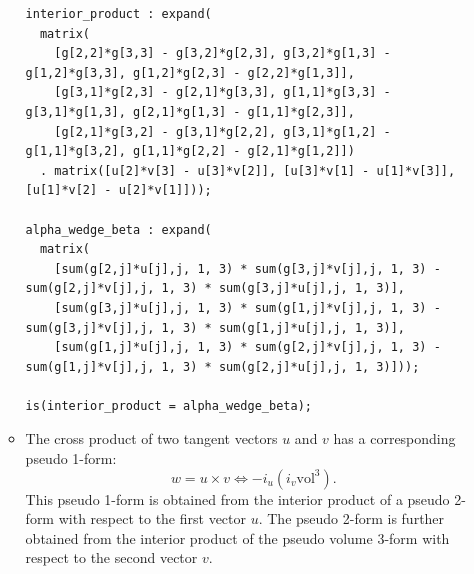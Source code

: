 \documentclass[11pt, a4paper]{book}
\begin{document}
\begin{enumerate}
\begin{itemize}
\begin{Proof}
\begin{lstlisting}
interior_product : expand(
  matrix(
    [g[2,2]*g[3,3] - g[3,2]*g[2,3], g[3,2]*g[1,3] - g[1,2]*g[3,3], g[1,2]*g[2,3] - g[2,2]*g[1,3]],
    [g[3,1]*g[2,3] - g[2,1]*g[3,3], g[1,1]*g[3,3] - g[3,1]*g[1,3], g[2,1]*g[1,3] - g[1,1]*g[2,3]],
    [g[2,1]*g[3,2] - g[3,1]*g[2,2], g[3,1]*g[1,2] - g[1,1]*g[3,2], g[1,1]*g[2,2] - g[2,1]*g[1,2]])
  . matrix([u[2]*v[3] - u[3]*v[2]], [u[3]*v[1] - u[1]*v[3]], [u[1]*v[2] - u[2]*v[1]]));

alpha_wedge_beta : expand(
  matrix(
    [sum(g[2,j]*u[j],j, 1, 3) * sum(g[3,j]*v[j],j, 1, 3) - sum(g[2,j]*v[j],j, 1, 3) * sum(g[3,j]*u[j],j, 1, 3)],
    [sum(g[3,j]*u[j],j, 1, 3) * sum(g[1,j]*v[j],j, 1, 3) - sum(g[3,j]*v[j],j, 1, 3) * sum(g[1,j]*u[j],j, 1, 3)],
    [sum(g[1,j]*u[j],j, 1, 3) * sum(g[2,j]*v[j],j, 1, 3) - sum(g[1,j]*v[j],j, 1, 3) * sum(g[2,j]*u[j],j, 1, 3)]));

is(interior_product = alpha_wedge_beta);
    \end{lstlisting}
    \end{Proof}
  \item The cross product of two tangent vectors $u$ and $v$ has a corresponding pseudo
    1-form:
    \begin{equation}
      w = u\times v \Longleftrightarrow -i_u(i_v \mathrm{vol}^3).
    \end{equation}
    This pseudo 1-form is obtained from the interior product of a pseudo 2-form with
    respect to the first vector $u$. The pseudo 2-form is further obtained from the
    interior product of the pseudo volume 3-form with respect to the second vector $v$.


\end{itemize}
\end{enumerate}
\end{document}
